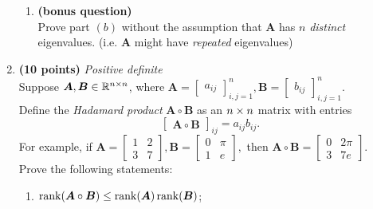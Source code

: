 \begin{enumerate}
\begin{enumerate}
\item \textbf{(bonus question)}\\
Prove part $(b)$ without the assumption that $\bm A$ has $n$ \textit{distinct} eigenvalues. (i.e. $\bm A$ might have \emph{repeated} eigenvalues)\\
\end{enumerate}
\newpage
\item \textbf{(10 points)} \textit{Positive definite}\\
Suppose $\bm A,\bm B\in\mathbb{R}^{n\times n}$, where $\bm A=\begin{bmatrix}
a_{ij}
\end{bmatrix}_{i,j=1}^{n}, \bm B=\begin{bmatrix}
b_{ij}
\end{bmatrix}_{i,j=1}^{n}$.\\
Define the \emph{Hadamard product} $\bm A\circ\bm B$ as an $n\times n$ matrix with entries
\[
\begin{bmatrix}
\bm A\circ\bm B
\end{bmatrix}_{ij}=a_{ij}b_{ij}.
\]
For example, if $\bm A=\begin{bmatrix}
1&2\\3&7
\end{bmatrix},\bm B=\begin{bmatrix}
0&\pi\\1&e
\end{bmatrix},$ then $\bm A\circ\bm B=\begin{bmatrix}
0&2\pi\\3&7e
\end{bmatrix}.$\\
Prove the following statements:
\begin{enumerate}
\item
$\operatorname{rank}(\bm A\circ\bm B)\le\operatorname{rank}(\bm A)\operatorname{rank}(\bm B)$;
\\

\end{enumerate}
\end{enumerate}
